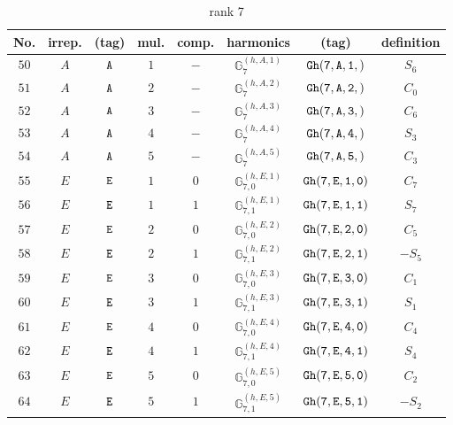 \documentclass[fleqn,8pt]{jsarticle}
\begin{document}
\begin{table}[ht!]
\begin{center}
\caption{rank 7}
\renewcommand{\arraystretch}{1.3}
\begin{tabular}{cccccccc} \hline \hline
No. & irrep. & (tag) & mul. & comp. & harmonics & (tag) & definition \\ \hline
$ 50 $ & $ A $ & $ {\tt A} $ & $ 1 $ & $ - $ & $ \mathbb{G}_{7}^{(h,A,1)} $ & $ {\tt Gh(7,A,1,)} $ & $ S_{6} $ \\
$ 51 $ & $ A $ & $ {\tt A} $ & $ 2 $ & $ - $ & $ \mathbb{G}_{7}^{(h,A,2)} $ & $ {\tt Gh(7,A,2,)} $ & $ C_{0} $ \\
$ 52 $ & $ A $ & $ {\tt A} $ & $ 3 $ & $ - $ & $ \mathbb{G}_{7}^{(h,A,3)} $ & $ {\tt Gh(7,A,3,)} $ & $ C_{6} $ \\
$ 53 $ & $ A $ & $ {\tt A} $ & $ 4 $ & $ - $ & $ \mathbb{G}_{7}^{(h,A,4)} $ & $ {\tt Gh(7,A,4,)} $ & $ S_{3} $ \\
$ 54 $ & $ A $ & $ {\tt A} $ & $ 5 $ & $ - $ & $ \mathbb{G}_{7}^{(h,A,5)} $ & $ {\tt Gh(7,A,5,)} $ & $ C_{3} $ \\
$ 55 $ & $ E $ & $ {\tt E} $ & $ 1 $ & $ 0 $ & $ \mathbb{G}_{7,0}^{(h,E,1)} $ & $ {\tt Gh(7,E,1,0)} $ & $ C_{7} $ \\
$ 56 $ & $ E $ & $ {\tt E} $ & $ 1 $ & $ 1 $ & $ \mathbb{G}_{7,1}^{(h,E,1)} $ & $ {\tt Gh(7,E,1,1)} $ & $ S_{7} $ \\
$ 57 $ & $ E $ & $ {\tt E} $ & $ 2 $ & $ 0 $ & $ \mathbb{G}_{7,0}^{(h,E,2)} $ & $ {\tt Gh(7,E,2,0)} $ & $ C_{5} $ \\
$ 58 $ & $ E $ & $ {\tt E} $ & $ 2 $ & $ 1 $ & $ \mathbb{G}_{7,1}^{(h,E,2)} $ & $ {\tt Gh(7,E,2,1)} $ & $ - S_{5} $ \\
$ 59 $ & $ E $ & $ {\tt E} $ & $ 3 $ & $ 0 $ & $ \mathbb{G}_{7,0}^{(h,E,3)} $ & $ {\tt Gh(7,E,3,0)} $ & $ C_{1} $ \\
$ 60 $ & $ E $ & $ {\tt E} $ & $ 3 $ & $ 1 $ & $ \mathbb{G}_{7,1}^{(h,E,3)} $ & $ {\tt Gh(7,E,3,1)} $ & $ S_{1} $ \\
$ 61 $ & $ E $ & $ {\tt E} $ & $ 4 $ & $ 0 $ & $ \mathbb{G}_{7,0}^{(h,E,4)} $ & $ {\tt Gh(7,E,4,0)} $ & $ C_{4} $ \\
$ 62 $ & $ E $ & $ {\tt E} $ & $ 4 $ & $ 1 $ & $ \mathbb{G}_{7,1}^{(h,E,4)} $ & $ {\tt Gh(7,E,4,1)} $ & $ S_{4} $ \\
$ 63 $ & $ E $ & $ {\tt E} $ & $ 5 $ & $ 0 $ & $ \mathbb{G}_{7,0}^{(h,E,5)} $ & $ {\tt Gh(7,E,5,0)} $ & $ C_{2} $ \\
$ 64 $ & $ E $ & $ {\tt E} $ & $ 5 $ & $ 1 $ & $ \mathbb{G}_{7,1}^{(h,E,5)} $ & $ {\tt Gh(7,E,5,1)} $ & $ - S_{2} $ \\
 \hline \hline
\end{tabular}
\end{center}
\end{table}
\end{document}
